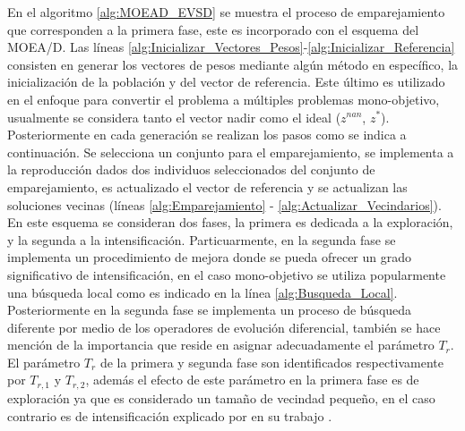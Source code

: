 En el algoritmo \ref{alg:MOEAD_EVSD} se muestra el proceso de emparejamiento que corresponden a la primera fase, este es incorporado con el esquema del MOEA/D.
%
Las líneas \ref{alg:Inicializar_Vectores_Pesos}-\ref{alg:Inicializar_Referencia} consisten en generar los vectores de pesos mediante algún método en específico, la inicialización de la población y del vector de referencia.
%
Este último es utilizado en el enfoque para convertir el problema a múltiples problemas mono-objetivo, usualmente se considera tanto el vector nadir como el ideal ($z^{nan}$, $z^*$).
%
Posteriormente en cada generación se realizan los pasos como se indica a continuación.
%
Se selecciona un conjunto para el emparejamiento, se implementa a la reproducción dados dos individuos seleccionados del conjunto de emparejamiento, es actualizado el vector de referencia y se actualizan las soluciones vecinas (líneas \ref{alg:Emparejamiento} - \ref{alg:Actualizar_Vecindarios}).
%
En este esquema se consideran dos fases, la primera es dedicada a la exploración, y la segunda a la intensificación.
%
Particuarmente, en la segunda fase se implementa un procedimiento de mejora donde se pueda ofrecer un grado significativo de intensificación, en el caso mono-objetivo se utiliza popularmente una búsqueda local como es indicado en la línea \ref{alg:Busqueda_Local}.
%
Posteriormente en la segunda fase se implementa un proceso de búsqueda diferente por medio de los operadores de evolución diferencial, también se hace mención de la importancia que reside en asignar adecuadamente el parámetro $T_r$.
%
El parámetro $T_r$ de la primera y segunda fase son identificados respectivamente por $T_{r,1}$ y $T_{r,2}$, además el efecto de este parámetro en la primera fase es de exploración ya que es considerado un tamaño de vecindad pequeño, en el caso contrario es de intensificación explicado por \citeauthor{Joel:MOEAD_Adaptative} en su trabajo \cite{Joel:MOEAD_Adaptative}.

